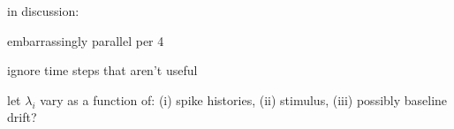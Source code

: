in discussion:

embarrassingly parallel per 4

ignore time steps that aren't useful

let $\lambda_i$ vary as a function of: (i) spike histories, (ii) stimulus, (iii) possibly baseline drift?
